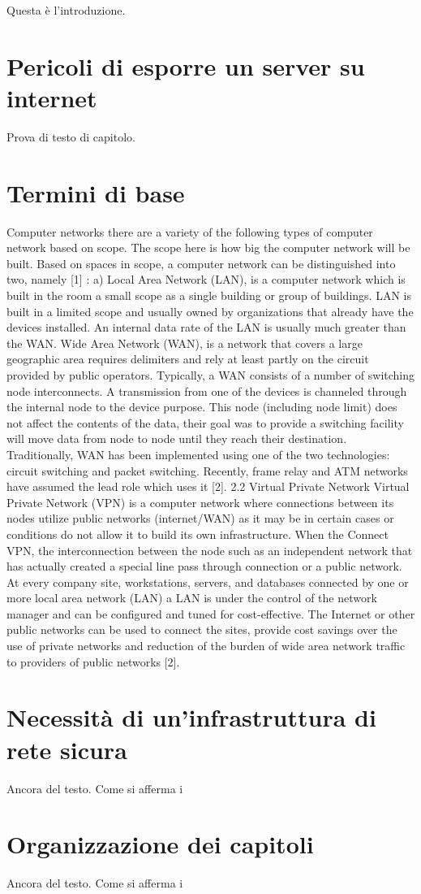 Questa è l'introduzione.

\section{Pericoli di esporre un server su internet}

Prova di testo di capitolo.

\section{Termini di base}

Computer networks there are a variety of the following types of computer network based on scope. The scope here is how big the computer network will be built. Based on spaces in scope, a computer network can be distinguished into two, namely [1] : a) Local Area Network (LAN), is a computer network which is built in the room a small scope as a single building or group of buildings. LAN is built in a limited scope and usually owned by organizations that already have the devices installed. An internal data rate of the LAN is usually much greater than the WAN. Wide Area Network (WAN), is a network that covers a large geographic area requires delimiters and rely at least partly on the circuit provided by public operators. Typically, a WAN consists of a number of switching node interconnects. A transmission from one of the devices is channeled through the internal node to the device purpose. This node (including node limit) does not affect the contents of the data, their goal was to
provide a switching facility will move data from node to node until they reach their destination. Traditionally, WAN has been implemented using one of the two technologies: circuit switching and packet switching. Recently, frame relay and ATM networks have assumed the lead role which uses it [2].
2.2 Virtual Private Network
Virtual Private Network (VPN) is a computer network where connections between its nodes utilize public networks (internet/WAN) as it may be in certain cases or conditions do not allow it to build its own infrastructure. When the Connect VPN, the interconnection between the node such as an independent network that has actually created a special line pass through connection or a public network. At every company site, workstations, servers, and databases connected by one or more local area network (LAN) a LAN is under the control of the network manager and can be configured and tuned for cost-effective. The Internet or other public networks can be used to connect the sites, provide cost savings over the use of private networks and reduction of the burden of wide area network traffic to providers of public networks [2].

\section{Necessità di un'infrastruttura di rete sicura}

Ancora del testo. Come si afferma i
\section{Organizzazione dei capitoli}

Ancora del testo. Come si afferma i

